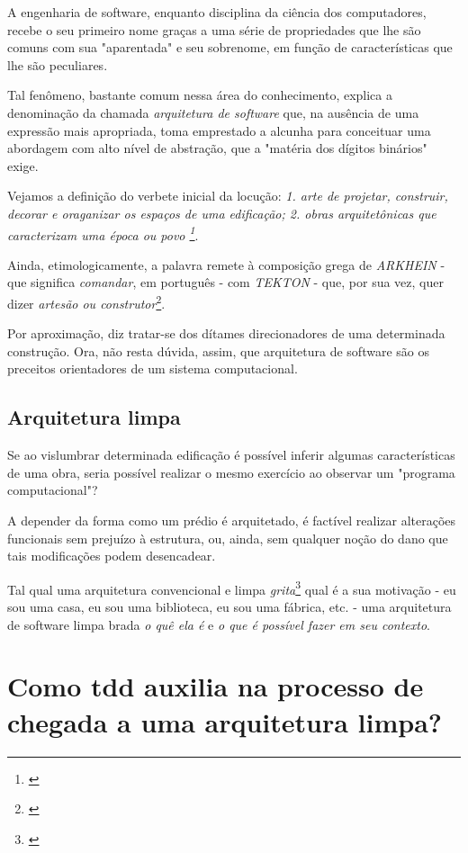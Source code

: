     A engenharia de software, enquanto disciplina da ciência dos computadores, recebe o seu primeiro nome graças a uma série de propriedades que lhe são comuns com sua "aparentada" e seu sobrenome, em função de características que lhe são peculiares.

    Tal fenômeno, bastante comum nessa área do conhecimento, explica a denominação da chamada \emph{arquitetura de software} que, na ausência de uma expressão mais apropriada, toma emprestado a alcunha para conceituar uma abordagem com alto nível de abstração, que a "matéria dos dígitos binários" exige.

    Vejamos a definição do verbete inicial da locução: \emph{1. arte de projetar, construir, decorar e oraganizar os espaços de uma edificação; 2. obras arquitetônicas que caracterizam uma época ou povo \footnote{\cite[p. 81]{Kury2007}}}.

    Ainda, etimologicamente, a palavra remete à composição grega de \emph{   ARKHEIN} - que significa \emph{comandar}, em português - com \emph{TEKTON} - que, por sua vez, quer dizer \emph{artesão ou construtor}\footnote{\cite{ Etimologia2019}}.

    Por aproximação, diz tratar-se dos dítames direcionadores de uma determinada construção. Ora, não resta dúvida, assim, que arquitetura de software são os preceitos orientadores de um sistema computacional.

    \subsection{Arquitetura limpa}

      Se ao vislumbrar determinada edificação é possível inferir algumas características de uma obra, seria possível realizar o mesmo exercício ao observar um "programa computacional"?

      A depender da forma como um prédio é arquitetado, é factível realizar alterações funcionais sem prejuízo à estrutura, ou, ainda, sem qualquer noção do dano que tais modificações podem desencadear.

      Tal qual uma arquitetura convencional e limpa \emph{grita}\footnote{\cite[p. 196]{ Martin2018}} qual é a sua motivação - eu sou uma casa, eu sou uma biblioteca, eu sou uma fábrica, etc. - uma arquitetura de software limpa brada \emph{o quê ela é} e \emph{o que é possível fazer em seu contexto}.

  \section{Como tdd auxilia na processo de chegada a uma arquitetura limpa?}

